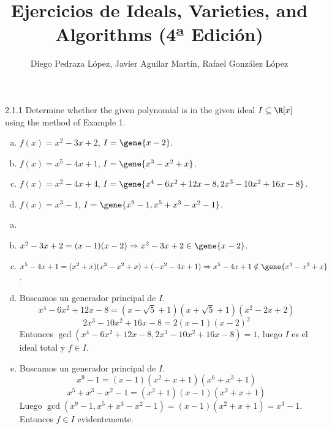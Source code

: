 \documentclass[twoside]{article}
\begin{document}
\title{Ejercicios de Ideals, Varieties, and Algorithms (4ª Edición)}
\author{Diego Pedraza López, Javier Aguilar Martín, Rafael González López}
\maketitle

\begin{ejercicio}{2.1.1}
Determine whether the given polynomial is in the given ideal $I \subseteq \R[x]$ using the method of Example 1.
\begin{enumerate}[a.]
\item $f(x) = x^2-3x+2$, $I = \gene{x-2}$.
\item $f(x) = x^5-4x+1$, $I = \gene{x^3-x^2+x}$.
\item $f(x) = x^2-4x+4$, $I = \gene{x^4-6x^2+12x-8,2x^3-10x^2+16x-8}$.
\item $f(x) = x^3-1$, $I = \gene{x^9-1,x^5+x^3-x^2-1}$.
\end{enumerate}
\end{ejercicio}
\begin{solucion}
\begin{enumerate}[a.]
\item[]
\item $x^2-3x+2 = (x-1)(x-2) \Rightarrow x^2-3x+2 \in \gene{x-2}$.
\item $x^5-4x+1 = (x^2+x)(x^3-x^2+x)+(-x^2-4x+1) \Rightarrow x^5-4x+1 \notin \gene{x^3-x^2+x}$.
\item Buscamos un generador principal de $I$.
\[ x^4-6x^2+12x-8 = (x-\sqrt{5}+1)(x+\sqrt{5}+1)(x^2-2x+2) \]
\[ 2x^3-10x^2+16x-8 = 2(x-1)(x-2)^2 \]
Entonces $\gcd(x^4-6x^2+12x-8,2x^3-10x^2+16x-8)=1$, luego $I$ es el ideal total y $f \in I$.
\item Buscamos un generador principal de $I$.
\[ x^9-1 = (x-1)(x^2+x+1)(x^6+x^3+1) \]
\[ x^5+x^3-x^2-1 = (x^2+1)(x-1)(x^2+x+1) \]
Luego $\gcd(x^9-1,x^5+x^3-x^2-1) = (x-1)(x^2+x+1) = x^3-1$.
Entonces $f \in I$ evidentemente.
\end{enumerate}
\end{solucion}

\newpage
\end{document}
